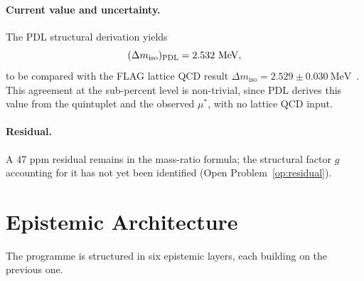 \documentclass[11pt,a4paper]{article}
\theoremstyle{plain}
\theoremstyle{definition}
\theoremstyle{remark}
\newcommand{\PDL}{\textnormal{PDL}}
\newcommand{\mustar}{\mu^*}
\begin{document}
\paragraph{Current value and uncertainty.}
The PDL structural derivation yields
\[
(\Delta m_{\mathrm{iso}})_{\PDL} = 2.532~\mathrm{MeV},
\]
to be compared with the FLAG lattice QCD result $\Delta m_{\mathrm{iso}} = 2.529\pm 0.030~\mathrm{MeV}$~\citep{D30}.
This agreement at the sub-percent level is non-trivial, since PDL derives this value from the quintuplet and the observed $\mustar$, with no lattice QCD input.

\paragraph{Residual.}
A 47 ppm residual remains in the mass-ratio formula; the structural factor $g$ accounting for it has not yet been identified (Open Problem~\ref{op:residual}).

\section{Epistemic Architecture}
\label{sec:epistemic}

The programme is structured in six epistemic layers, each building on the previous one.
\end{document}
